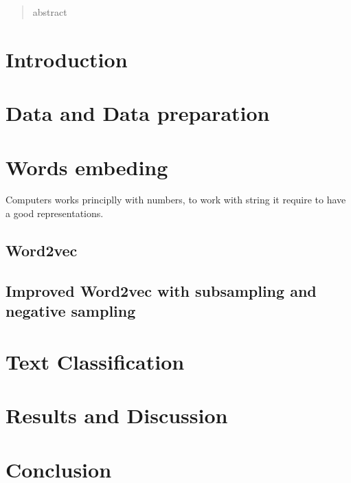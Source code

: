 \begin{abstract}
	abstract
\end{abstract}

\section{Introduction}
\section{Data and Data preparation}
\section{Words embeding}
Computers works principlly with numbers, to work with string it require to have a good representations. 
\subsection{Word2vec}
\subsection{Improved Word2vec with subsampling and negative sampling}
\section{Text Classification}
\section{Results and Discussion}
\section{Conclusion}